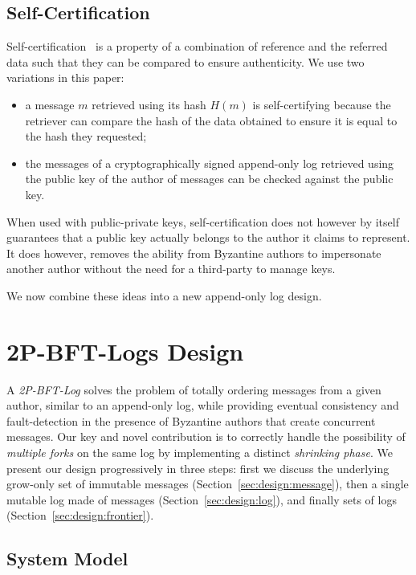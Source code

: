 \documentclass[9pt, oneside]{article}   	%
\begin{document}
\subsection{Self-Certification}
\label{sec:background:self-certification}

Self-certification~\cite{mazieres2000selfcertifyingfs} is a property of a combination of reference and the referred data such that they can be compared to ensure authenticity. We use two variations  in this paper:
\begin{itemize}
	\item a message $m$ retrieved using its hash $H(m)$ is self-certifying because the retriever can compare the hash of the data obtained to ensure it is equal to the hash they requested;
	\item the messages of a cryptographically signed append-only log retrieved using the public key of the author of messages can be checked against the public key. 
\end{itemize}

When used with public-private keys, self-certification does not however by itself guarantees that a public key actually belongs to the author it claims to represent. It does however, removes the ability from Byzantine authors to impersonate another author without the need for a third-party to manage keys.




We now combine these ideas into a new append-only log design.

\section{2P-BFT-Logs Design}
\label{sec:design}


A \textit{2P-BFT-Log} solves the problem of  totally ordering messages from a given author, similar to an append-only log, while providing eventual consistency and fault-detection in the presence of Byzantine authors that create concurrent messages.
Our key and novel contribution is to correctly handle the possibility of \textit{multiple forks} on the same log by implementing a distinct \textit{shrinking phase}. We present our design progressively in three steps: first we discuss the underlying grow-only set of immutable messages (Section~\ref{sec:design:message}), then a single mutable log made of messages (Section~\ref{sec:design:log}), and finally sets of logs (Section~\ref{sec:design:frontier}).

\subsection{System Model}
\end{document}
